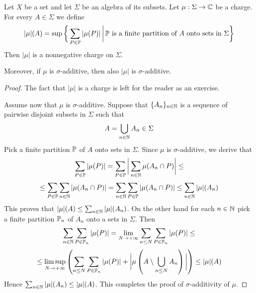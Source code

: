 \begin{fact}\label{fact:total_variation_is_a_charge}
    Let $X$ be a set and let $\Sigma$ be an algebra of its subsets. Let $\mu:\Sigma \rightarrow {\mathbb C}$ be a charge. For every $A \in \Sigma$ we define
    $$|\mu|(A) = \sup \bigg\{\sum_{P\in {\mathbb P}}|\mu(P)|\,\bigg|\,{\mathbb P}\mbox{ is a finite partition of }A\mbox{ onto sets in }\Sigma\bigg\}$$
    Then $|\mu|$ is a nonnegative charge on $\Sigma$.

    Moreover, if $\mu$ is $\sigma$-additive, then also $|\mu|$ is $\sigma$-additive.
\end{fact}
\begin{proof}
    The fact that $|\mu|$ is a charge is left for the reader as an exercise.

    Assume now that $\mu$ is $\sigma$-additive. Suppose that $\{A_n\}_{n\in {\mathbb N}}$ is a sequence of pairwise disjoint subsets in $\Sigma$ such that
    $$A = \bigcup_{n\in {\mathbb N}}A_n \in \Sigma$$
    Pick a finite partition ${\mathbb P}$ of $A$ onto sets in $\Sigma$. Since $\mu$ is $\sigma$-additive, we derive that
    $$\sum_{P\in {\mathbb P}}|\mu(P)| = \sum_{P\in {\mathbb P}}\bigg|\sum_{n\in {\mathbb N}}\mu(A_n \cap P)\bigg| \leq$$
    $$\leq \sum_{P\in {\mathbb P}}\sum_{n\in {\mathbb N}}|\mu(A_n \cap P)| = \sum_{n\in {\mathbb N}}\sum_{P\in {\mathbb P}}|\mu(A_n \cap P)| \leq \sum_{n \in {\mathbb N}}|\mu|(A_n)$$
    This proves that $|\mu|(A) \leq \sum_{n \in {\mathbb N}}|\mu|(A_n)$. On the other hand for each $n \in {\mathbb N}$ pick a finite partition ${\mathbb P}_n$ of $A_n$ onto a sets in $\Sigma$. Then
    $$\sum_{n \in {\mathbb N}}\sum_{P \in {\mathbb P}_n}|\mu(P)| = \lim_{N\rightarrow +\infty}\sum_{n\leq N}\sum_{P \in {\mathbb P}_n}|\mu(P)| \leq $$
    $$\leq \limsup_{N \rightarrow +\infty}\left(\sum_{n\leq N}\sum_{P \in {\mathbb P}_n}|\mu(P)| + \bigg|\mu\left(A\setminus \bigcup_{n\leq N}A_n\right)\bigg|\right) \leq |\mu|(A)$$
    Hence $\sum_{n \in {\mathbb N}}|\mu|(A_n) \leq |\mu|(A)$. This completes the proof of $\sigma$-additivity of $\mu$.
\end{proof}

